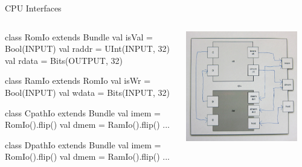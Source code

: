 \documentclass[xcolor=pdflatex,dvipsnames,table]{beamer}
\begin{document}
\begin{frame}[fragile]{CPU Interfaces}
\begin{columns}

\begin{scala}
class RomIo extends Bundle {
  val isVal = Bool(INPUT)
  val raddr = UInt(INPUT, 32)
  val rdata = Bits(OUTPUT, 32) 
}

class RamIo extends RomIo {
  val isWr  = Bool(INPUT)
  val wdata = Bits(INPUT, 32) 
}

class CpathIo extends Bundle {
  val imem = RomIo().flip()
  val dmem = RamIo().flip()
  ... }

class DpathIo extends Bundle {
  val imem = RomIo().flip()
  val dmem = RamIo().flip()
  ... }
\end{scala}


\begin{center}
\includegraphics[width=0.9\textwidth]{../tutfigs/cpu.png} 
\end{center}

\end{columns}
\end{frame}
\end{document}
